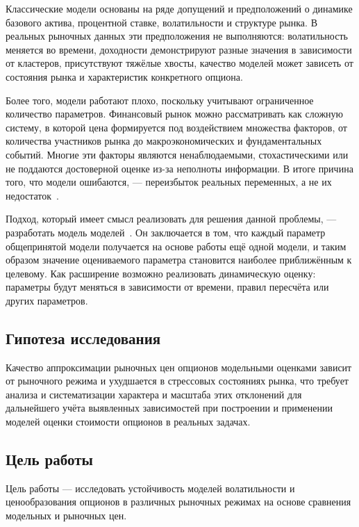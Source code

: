 \documentclass[11pt,a4paper]{article}
\begin{document}
Классические модели основаны на ряде допущений и предположений о динамике базового актива, процентной ставке, волатильности и структуре рынка. В реальных рыночных данных эти предположения не выполняются: волатильность меняется во времени, доходности демонстрируют разные значения в зависимости от кластеров, присутствуют тяжёлые хвосты, качество моделей может зависеть от состояния рынка и характеристик конкретного опциона.

Более того, модели работают плохо, поскольку учитывают ограниченное количество параметров. Финансовый рынок можно рассматривать как сложную систему, в которой цена формируется под воздействием множества факторов, от количества участников рынка до макроэкономических и фундаментальных событий. Многие эти факторы являются ненаблюдаемыми, стохастическими или не поддаются достоверной оценке из-за неполноты информации. В итоге причина того, что модели ошибаются, --- переизбыток реальных переменных, а не их недостаток~\cite{Mantegna}.

Подход, который имеет смысл реализовать для решения данной проблемы, --- разработать модель моделей~\cite{Ilyinsky}. Он заключается в том, что каждый параметр общепринятой модели получается на основе работы ещё одной модели, и таким образом значение оцениваемого параметра становится наиболее приближённым к целевому. Как расширение возможно реализовать динамическую оценку: параметры будут меняться в зависимости от времени, правил пересчёта или других параметров.

\subsection*{Гипотеза исследования}

Качество аппроксимации рыночных цен опционов модельными оценками зависит от рыночного режима и ухудшается в стрессовых состояниях рынка, что требует анализа и систематизации характера и масштаба этих отклонений для дальнейшего учёта выявленных зависимостей при построении и применении моделей оценки стоимости опционов в реальных задачах.

\subsection*{Цель работы}

Цель работы --- исследовать устойчивость моделей волатильности и ценообразования опционов в различных рыночных режимах на основе сравнения модельных и рыночных цен.
\end{document}
